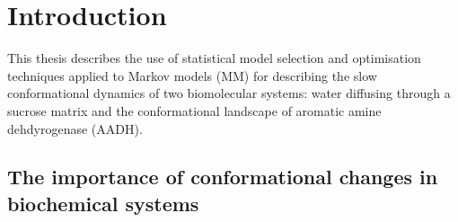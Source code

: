 %
%
\let\textcircled=\pgftextcircled
\chapter{Introduction}
\label{chap:intro}



This thesis describes the use of statistical model selection and optimisation techniques applied to Markov models (MM) for describing the slow conformational dynamics of two biomolecular systems: water diffusing through a sucrose matrix and the conformational landscape of aromatic amine dehdyrogenase (AADH).

\section{The importance of conformational changes in biochemical systems}

